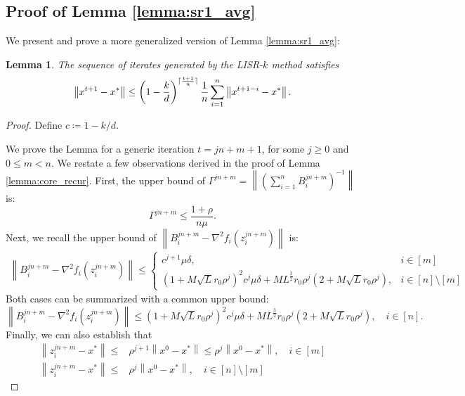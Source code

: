 \documentclass[letterpaper]{article} %
\theoremstyle{plain}
\newtheorem{lemma}[theorem]{Lemma}
\theoremstyle{definition}
\theoremstyle{remark}
\DeclarePairedDelimiter\ceil{\lceil}{\rceil}
\newcommand\norm[1]{\left\lVert#1\right\rVert}
\begin{document}
\subsection{Proof of Lemma \ref{lemma:sr1_avg}}
We present and prove a more generalized version of Lemma \ref{lemma:sr1_avg}:
\begin{lemma}
    The sequence of iterates generated by the LISR-$k$ method satisfies
    \begin{equation*}
        \norm{x^{t+1} - x^*} \leq \left(1 - \frac{k}{d}\right)^{\ceil{\frac{t+1}{n}}}\frac{1}{n}\sum_{i=1}^n \norm{x^{t+1-i} - x^*}.
    \end{equation*}
    \label{lemma:srk_avg}
\end{lemma}
\begin{proof}
    Define $c \coloneqq 1 - k / d$.

    We prove the Lemma for a generic iteration $t = j n+ m + 1$, for some $j \geq 0$ and $0 \leq m < n$. We restate a few observations derived in the proof of Lemma \ref{lemma:core_recur}. First, the upper bound of $\Gamma^{j n + m} = \norm{(\sum_{i=1}^n B_i^{j n + m})^{-1}}$ is:
    \begin{equation}
        \Gamma^{j n + m} \leq \frac{1 + \rho}{n \mu}.
        \label{prev_result_1}
    \end{equation}
    Next, we recall the upper bound of $\norm{B_{i}^{j n + m} - \nabla^2 f_i (z_i^{j n + m})}$ is:
    \begin{align*}
        \norm{B_i^{j n + m} - \nabla^2 f_i(z_i^{j n + m})} \leq 
        \begin{cases}
        c^{j + 1} \mu \delta, & i \in [m]\\    
        (1 + M \sqrt{L}r_0 \rho^j)^2 c^j \mu \delta + M L^{\frac{3}{2}} r_0 \rho^j (2 + M \sqrt{L} r_0 \rho^j), & i \in [n]\setminus [m]
        \end{cases}
    \end{align*}
    Both cases can be summarized with a common upper bound:
    \begin{equation}
         \norm{B_i^{j n + m} - \nabla^2 f_i(z_i^{j n + m})} \leq (1 + M \sqrt{L}r_0 \rho^j)^2 c^j \mu \delta + M L^{\frac{3}{2}} r_0 \rho^j (2 + M \sqrt{L} r_0 \rho^j), \quad i \in [n].
        \label{prev_result_2}
    \end{equation}
    Finally, we can also establish that
    \begin{equation}
        \begin{split}
        \norm{z_i^{j n + m} - x^*} \leq & \rho^{j + 1} \norm{x^0 - x^*} \leq \rho^{j } \norm{x^0 - x^*}, \quad i \in [m] \\
        \norm{z_i^{j n + m} - x^*} \leq & \rho^{j } \norm{x^0 - x^*}, \quad i \in [n] \setminus [m]
    \end{split}
    \label{prev_result_3}
    \end{equation}
  


\end{proof}
\end{document}
